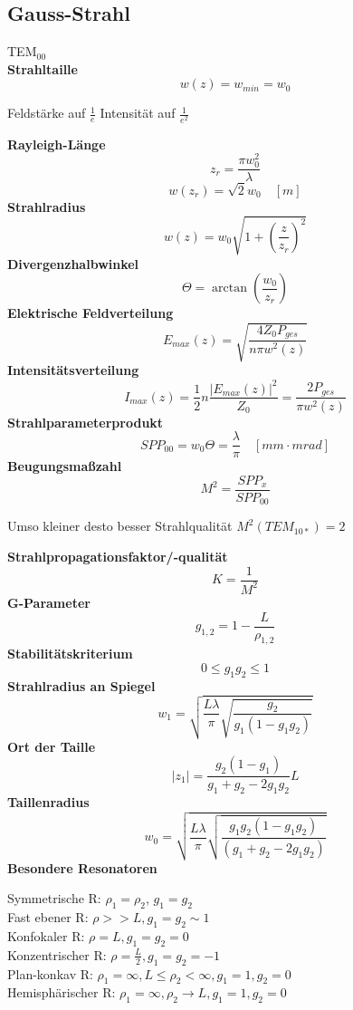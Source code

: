 \documentclass[12pt,a4paper,oneside]{article}
\begin{document}
\subsection*{Gauss-Strahl}
\begin{multicols}{2}
TEM$_{00}$ \\
\textbf{Strahltaille} $$w(z) = w_{min}= w_0 $$ \begin{tiny}Feldstärke auf $\frac{1}{e}$ Intensität auf $\frac{1}{e^2}$\\\end{tiny}
\textbf{Rayleigh-Länge} $$ z_r = \frac{\pi w_0^2}{\lambda}$$ $$w(z_r) = \sqrt{2} w_0 \quad [m]$$
\textbf{Strahlradius} $$ w(z)= w_0 \sqrt{1 + (\frac{z}{z_r})^2} $$
\textbf{Divergenzhalbwinkel} $$\Theta = \arctan(\frac{w_0}{z_r}) $$
\textbf{Elektrische Feldverteilung }$$ E_{max}(z) = \sqrt{\frac{4 Z_0 P_{ges}}{n \pi w^2(z)}}$$
\textbf{Intensitätsverteilung} $$I_{max} (z)= \frac{1}{2} n \frac{|E_{max}(z)|^2}{Z_0}=\frac{2 P_{ges}}{\pi w^2(z)}$$
\textbf{Strahlparameterprodukt} $$SPP_{00} = w_0 \Theta = \frac{\lambda}{\pi} \quad [mm \cdot mrad]$$
\textbf{Beugungsmaßzahl} $$ M^2 = \frac{SPP_x}{SPP_{00}}$$ \begin{tiny}Umso kleiner desto besser Strahlqualität $M^2(TEM_{10*})=2$\\
\end{tiny}
\textbf{Strahlpropagationsfaktor/-qualität }$$K = \frac{1}{M^2}$$
\textbf{G-Parameter }$$g_{1,2}= 1- \frac{L}{\rho_{1,2}}$$
\textbf{Stabilitätskriterium} $$0  \leq g_1 g_2 \leq 1 $$
\textbf{Strahlradius an Spiegel} $$w_1 = \sqrt{\frac{L \lambda}{\pi}\sqrt{\frac{g_2}{g_1(1-g_1 g_2)}}}$$
\textbf{Ort der Taille }$$|z_1| = \frac{g_2 (1 - g_1)}{g_1 + g_2 - 2 g_1 g_2} L $$
\textbf{Taillenradius} $$ w_0 = \sqrt{\frac{L \lambda}{\pi}\sqrt{\frac{g_1 g_2 (1-g_1 g_2)}{(g_1 + g_2 - 2 g_1 g_2)}}}$$
\textbf{Besondere Resonatoren} \\\begin{tiny}
	Symmetrische R: $ \rho_1 = \rho_2$, $g_1 = g_2$\\
	Fast ebener R: $\rho >> L, g_1 = g_2 \sim 1 $\\
	Konfokaler R: $\rho = L, g_1 = g_2 = 0 $\\
	Konzentrischer R: $\rho = \frac{L}{2}, g_1 = g_2 = -1$\\
	Plan-konkav R: $\rho_1 = \infty, L \leq \rho_2 < \infty, g_1 = 1, g_2 = 0$\\
	Hemisphärischer R: $\rho_1 = \infty, \rho_2 \rightarrow L, g_1 = 1, g_2 = 0$\\
\end{tiny}
\end{multicols}
\end{document}
